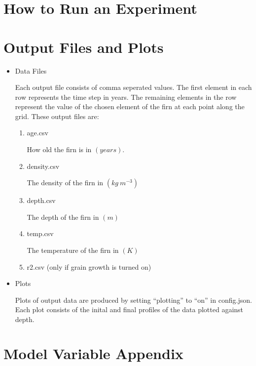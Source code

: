 \documentclass{article}
\begin{document}
\section{How to Run an Experiment}

\section{Output Files and Plots}
\begin{itemize}
  \item Data Files

  Each output file consists of comma seperated values. The first element in each row represents the time step in years.
  The remaining elements in the row represent the value of the chosen element of the firn at each point along the grid.
  These output files are:
  \begin{enumerate}
    \item age.csv

    How old the firn is in  \begin{math}(years)\end{math}.
    \item density.csv

    The density of the firn in \begin{math}(kg \: m^{-3})\end{math}
    \item depth.csv

    The depth of the firn in  \begin{math}(m)\end{math}

    \item temp.csv

    The temperature of the firn in  \begin{math}(K)\end{math}

    \item r2.csv (only if grain growth is turned on)
  \end{enumerate}
  \item Plots

  Plots of output data are produced by setting ``plotting'' to ``on'' in config.json. Each plot consists of the inital and final
  profiles of the data plotted against depth.
\end{itemize}


\newpage
\appendix
\section{Model Variable Appendix}
\end{document}
